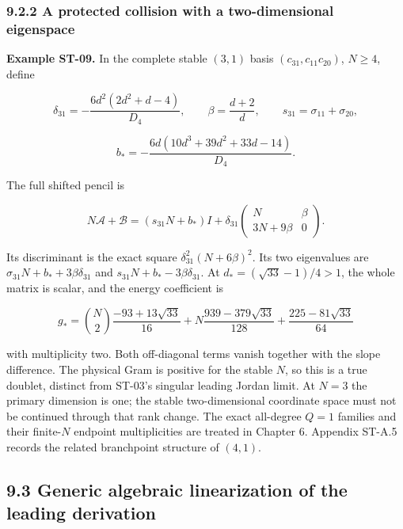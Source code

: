 \hypertarget{a-protected-collision-with-a-two-dimensional-eigenspace}{%
\subsubsection{9.2.2 A protected collision with a two-dimensional eigenspace}\label{a-protected-collision-with-a-two-dimensional-eigenspace}}

\textbf{Example ST-09.} In the complete stable \((3,1)\) basis \((c_{31},c_{11}c_{20})\), \(N\geq4\), define

\[
\delta_{31}=-\frac{6d^2(2d^2+d-4)}{D_4},\qquad
\beta=\frac{d+2}{d},\qquad s_{31}=\sigma_{11}+\sigma_{20},
\]

\[
b_*=-\frac{6d(10d^3+39d^2+33d-14)}{D_4}.
\]

The full shifted pencil is

\[
N\mathscr A+\mathscr B=
(s_{31}N+b_*)I+
\delta_{31}\begin{pmatrix}N&\beta\\3N+9\beta&0\end{pmatrix}.
\]

Its discriminant is the exact square \(\delta_{31}^2(N+6\beta)^2\). Its two eigenvalues are \(\sigma_{31}N+b_*+3\beta\delta_{31}\) and \(s_{31}N+b_*-3\beta\delta_{31}\). At \(d_*=(\sqrt{33}-1)/4>1\), the whole matrix is scalar, and the energy coefficient is

\[
g_*=\binom N2\frac{-93+13\sqrt{33}}{16}
+N\frac{939-379\sqrt{33}}{128}
+\frac{225-81\sqrt{33}}{64}
\]

with multiplicity two. Both off-diagonal terms vanish together with the slope difference. The physical Gram is positive for the stable \(N\), so this is a true doublet, distinct from ST-03's singular leading Jordan limit. At \(N=3\) the primary dimension is one; the stable two-dimensional coordinate space must not be continued through that rank change. The exact all-degree \(Q=1\) families and their finite-\(N\) endpoint multiplicities are treated in Chapter 6. Appendix ST-A.5 records the related branchpoint structure of \((4,1)\).

\hypertarget{generic-algebraic-linearization-of-the-leading-derivation}{%
\subsection{9.3 Generic algebraic linearization of the leading derivation}\label{generic-algebraic-linearization-of-the-leading-derivation}}

